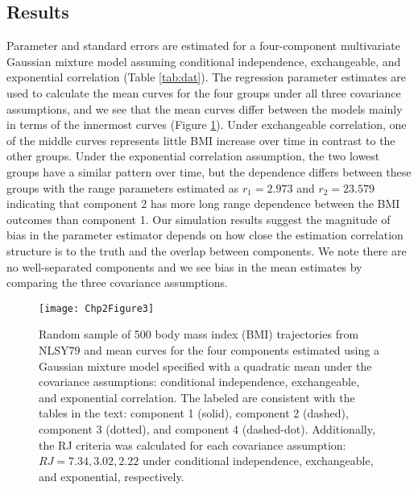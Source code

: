 \documentclass[10pt]{article}
\begin{document}
\subsection{Results}
Parameter and standard errors are estimated for a four-component multivariate Gaussian mixture model assuming conditional independence, exchangeable, and exponential correlation (Table \ref{tab:dat}). The regression parameter estimates are used to calculate the mean curves for the four groups under all three covariance assumptions, and we see that the mean curves differ between the models mainly in terms of the innermost curves (Figure \ref{fig:2-3}).  Under exchangeable correlation, one of the middle curves represents little BMI increase over time in contrast to the other groups. Under the exponential correlation assumption, the two lowest groups have a similar pattern over time, but the dependence differs between these groups with the range parameters estimated as $r_1=2.973$ and $r_2=23.579$ indicating that component 2 has more long range dependence between the BMI outcomes than component 1. Our simulation results suggest the magnitude of bias in the parameter estimator depends on how close the estimation correlation structure is to the truth and the overlap between components. We note there are no well-separated components and we see bias in the mean estimates by comparing the three covariance assumptions. \\
\begin{figure}
\begin{center}
\texttt{[image: Chp2Figure3]}
\end{center}
\caption{Random sample of 500 body mass index (BMI) trajectories from NLSY79 and mean curves for the four components estimated using a Gaussian mixture model specified with a quadratic mean under the covariance assumptions: conditional independence, exchangeable, and exponential correlation. The labeled are consistent with the tables in the text: component 1 (solid), component 2 (dashed), component 3 (dotted), and component 4 (dashed-dot). Additionally, the RJ criteria was calculated for each covariance assumption: $RJ =7.34,3.02,2.22$ under conditional independence, exchangeable, and exponential, respectively.}
\label{fig:2-3}
\end{figure}
\end{document}
